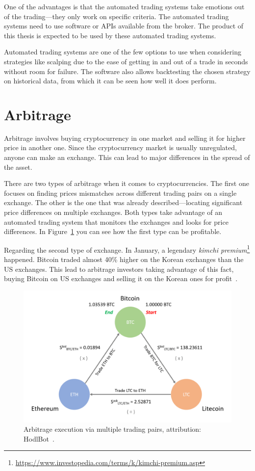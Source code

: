 One of the advantages is that the automated trading systems take emotions out of the trading---they only work on specific criteria. The automated trading systems need to use software or APIs available from the broker. The product of this thesis is expected to be used by these automated trading systems.

Automated trading systems are one of the few options to use when considering strategies like scalping due to the ease of getting in and out of a trade in seconds without room for failure. The software also allows backtesting the chosen strategy on historical data, from which it can be seen how well it does perform.

\section{Arbitrage}
Arbitrage involves buying cryptocurrency in one market and selling it for higher price in another one. Since the cryptocurrency market is usually unregulated, anyone can make an exchange. This can lead to major differences in the spread of the asset.

There are two types of arbitrage when it comes to cryptocurrencies. The first one focuses on finding prices mismatches across different trading pairs on a single exchange. The other is the one that was already described---locating significant price differences on multiple exchanges. Both types take advantage of an automated trading system that monitors the exchanges and looks for price differences. In Figure~\ref{arbitrage-figure} you can see how the first type can be profitable.

Regarding the second type of exchange. In January, a legendary \emph{kimchi premium}\footnote{\url{https://www.investopedia.com/terms/k/kimchi-premium.asp}} happened. Bitcoin traded almost 40\% higher on the Korean exchanges than the US exchanges. This lead to arbitrage investors taking advantage of this fact, buying Bitcoin on US exchanges and selling it on the Korean ones for profit~\cite{hodlbot:day-trading-cryptocurrency}.

\begin{figure}[!t]
    \centering
    \includegraphics[width=\columnwidth]{figures/arbitrage.png}
    \caption{Arbitrage execution via multiple trading pairs, attribution: HodlBot~\cite{hodlbot:day-trading-cryptocurrency}.}
    \label{arbitrage-figure}
\end{figure}


